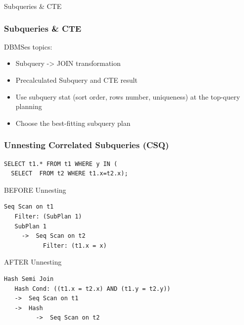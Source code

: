 \documentclass{beamer}
\begin{document}

\begin{frame}
\vspace*{\fill}
\begin{center}
Subqueries \& CTE
\end{center}
\vspace*{\fill}
\end{frame}

\begin{frame}\frametitle{Subqueries \& CTE}
DBMSes topics:
\begin{itemize}
  \item Subquery -> JOIN transformation
  \item Precalculated Subquery and CTE result
  \item Use subquery stat (sort order, rows number, uniqueness) at the top-query planning
  \item Choose the best-fitting subquery plan
\end{itemize}
\end{frame}


\begin{frame}[fragile]\frametitle{Unnesting Correlated Subqueries (CSQ)}
\begin{lstlisting}
SELECT t1.* FROM t1 WHERE y IN (
  SELECT  FROM t2 WHERE t1.x=t2.x);
\end{lstlisting}

\begin{block}{BEFORE Unnesting}
\begin{lstlisting}[basicstyle=\footnotesize]
 Seq Scan on t1
   Filter: (SubPlan 1)
   SubPlan 1
     ->  Seq Scan on t2
           Filter: (t1.x = x)
\end{lstlisting}\end{block}

\begin{block}{AFTER Unnesting}
\begin{lstlisting}[basicstyle=\footnotesize]
 Hash Semi Join
   Hash Cond: ((t1.x = t2.x) AND (t1.y = t2.y))
   ->  Seq Scan on t1
   ->  Hash
         ->  Seq Scan on t2
\end{lstlisting}\end{block}
\end{frame}
\end{document}
